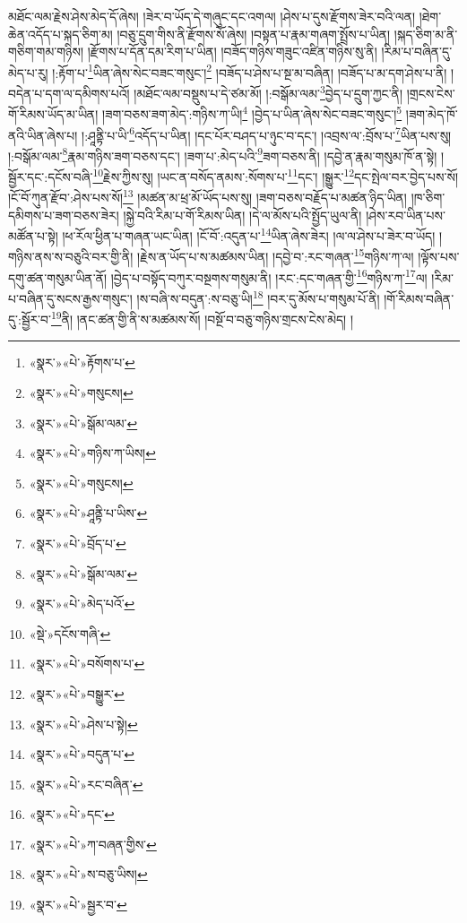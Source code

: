 མཐོང་ལམ་རྗེས་ཤེས་མེད་དོ་ཞེས། །ཟེར་བ་ཡོད་དེ་གཞུང་དང་འགལ། །ཤེས་པ་དུས་རྫོགས་ཟེར་བའི་ལན། །ཐེག་ཆེན་འདོད་པ་སྐད་ཅིག་མ། །བཅུ་དྲུག་གིས་ནི་རྫོགས་སོ་ཞེས། །བསྟན་པ་རྣམ་གཞག་སྤྲོས་པ་ཡིན། །སྐད་ཅིག་མ་ནི་གཅིག་གམ་གཉིས། །རྫོགས་པ་དོན་དམ་རིག་པ་ཡིན། །བཟོད་གཉིས་གཟུང་འཛིན་གཉིས་སུ་ནི། །རིམ་པ་བཞིན་དུ་མེད་པ་རུ། །:རྟོག་པ་\footnote{«སྣར་»«པེ་»རྟོགས་པ་}ཡིན་ཞེས་སེང་བཟང་གསུང་།\footnote{«སྣར་»«པེ་»གསུངས།} །བཟོད་པ་ཤེས་པ་སྔ་མ་བཞིན། །བཟོད་པ་མ་དག་ཤེས་པ་ནི། །བདེན་པ་དག་ལ་དམིགས་པའོ། །མཐོང་ལམ་བསྡུས་པ་དེ་ཙམ་མོ། །:བསྒོམ་ལམ་\footnote{«སྣར་»«པེ་»སྒོམ་ལམ་}བྱེད་པ་དྲུག་ཀྱང་ནི། །གྲངས་ངེས་གོ་རིམས་ཡོད་མ་ཡིན། །ཟག་བཅས་ཟག་མེད་:གཉིས་ཀ་ཡི།\footnote{«སྣར་»«པེ་»གཉིས་ཀ་ཡིས།} །བྱེད་པ་ཡིན་ཞེས་སེང་བཟང་གསུང་།\footnote{«སྣར་»«པེ་»གསུངས།} །ཟག་མེད་ཁོ་ནའི་ཡིན་ཞེས་པ། །:ཤཱནྟི་པ་ཡི་\footnote{«སྣར་»«པེ་»ཤཱནྟི་པ་ཡིས་}འདོད་པ་ཡིན། །དང་པོར་བཤད་པ་ཉུང་བ་དང་། །འབྲས་ལ་:བྲོས་པ་\footnote{«སྣར་»«པེ་»བྲོད་པ་}ཡིན་པས་སུ། །:བསྒོམ་ལམ་\footnote{«སྣར་»«པེ་»སྒོམ་ལམ་}རྣམ་གཉིས་ཟག་བཅས་དང་། །ཟག་པ་:མེད་པའི་\footnote{«སྣར་»«པེ་»མེད་པའོ་}ཟག་བཅས་ནི། །དབྱེ་ན་རྣམ་གསུམ་ཁོ་ན་སྟེ། །སྦྱོར་དང་:དངོས་བཞི་\footnote{«སྡེ་»དངོས་གཞི་}རྗེས་ཀྱིས་སུ། །ཡང་ན་བསོད་ནམས་:སོགས་པ་\footnote{«སྣར་»«པེ་»བསོགས་པ་}དང་། །སྒྱུར་\footnote{«སྣར་»«པེ་»བསྒྱུར་}དང་སྤེལ་བར་བྱེད་པས་སོ། །ངོ་བོ་ཀུན་རྫོབ་:ཤེས་པས་སོ།\footnote{«སྣར་»«པེ་»ཤེས་པ་སྟེ།} །མཚན་མ་ཕྲ་མོ་ཡོད་པས་སུ། །ཟག་བཅས་བརྗོད་པ་མཚན་ཉིད་ཡིན། །ཁ་ཅིག་དམིགས་པ་ཟག་བཅས་ཟེར། །སྐྱེ་བའི་རིམ་པ་གོ་རིམས་ཡིན། །དེ་ལ་མོས་པའི་སྤྱོད་ཡུལ་ནི། །ཤེས་རབ་ཡིན་པས་མཚོན་པ་སྟེ། །ཕ་རོལ་ཕྱིན་པ་གཞན་ཡང་ཡིན། །ངོ་བོ་:འདུན་པ་\footnote{«སྣར་»«པེ་»བདུན་པ་}ཡིན་ཞེས་ཟེར། །ལ་ལ་ཤེས་པ་ཟེར་བ་ཡོད། །གཉིས་ནས་ས་བཅུའི་བར་གྱི་ནི། །རྗེས་ན་ཡོད་པ་ས་མཚམས་ཡིན། །དབྱེ་བ་:རང་གཞན་\footnote{«སྣར་»«པེ་»རང་བཞིན་}གཉིས་ཀ་ལ། །ལྟོས་པས་དགུ་ཚན་གསུམ་ཡིན་ནོ། །བྱེད་པ་བསྟོད་བཀུར་བསྔགས་གསུམ་ནི། །རང་:དང་གཞན་གྱི་\footnote{«སྣར་»«པེ་»དང་}གཉིས་ཀ་\footnote{«སྣར་»«པེ་»ཀ་བཞན་གྱིས་}ལ། །རིམ་པ་བཞིན་དུ་སངས་རྒྱས་གསུང་། །ས་བཞི་ས་བདུན་:ས་བཅུ་ཡི།\footnote{«སྣར་»«པེ་»ས་བཅུ་ཡིས།} །བར་དུ་མོས་པ་གསུམ་པོ་ནི། །གོ་རིམས་བཞིན་དུ་:སྦྱོར་བ་\footnote{«སྣར་»«པེ་»སྦྱར་བ་}ནི། །ནང་ཚན་གྱི་ནི་ས་མཚམས་སོ། །བསྔོ་བ་བཅུ་གཉིས་གྲངས་ངེས་མེད། །
